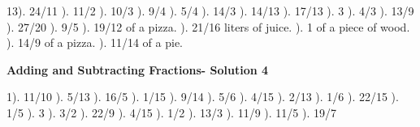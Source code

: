 \documentclass{article}%
\begin{document}
13). 24/11%
). 11/2%
). 10/3%
). 9/4%
). 5/4%
). 14/3%
). 14/13%
). 17/13%
). 3%
). 4/3%
). 13/9%
). 27/20%
). 9/5%
). 19/12 of a pizza.%
). 21/16 liters of juice.%
). 1 of a piece of wood.%
). 14/9 of a pizza.%
). 11/14 of a pie.%
\newline%
\newpage%
\large%
\begin{center}%
\textbf{Adding and Subtracting Fractions- Solution 4}%
\newline%
\end{center} \normalsize%
1). 11/10%
). 5/13%
). 16/5%
). 1/15%
). 9/14%
). 5/6%
). 4/15%
). 2/13%
). 1/6%
). 22/15%
). 1/5%
). 3%
). 3/2%
). 22/9%
). 4/15%
). 1/2%
). 13/3%
). 11/9%
). 11/5%
). 19/7%
\newline%
\end{document}
